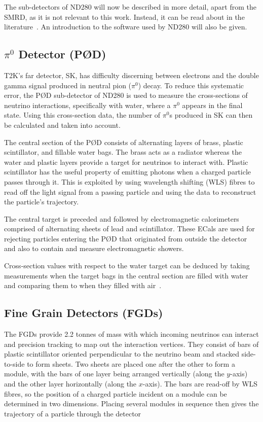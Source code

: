 \documentclass[aps,pra,12pt,notitlepage,tightenlines]{revtex4-1}
\begin{document}
The sub-detectors of ND280 will now be described in more detail, apart from the SMRD, as it is not relevant to this work. Instead, it can be read about in the literature~\cite{Aoki2013}. An introduction to the software used by ND280 will also be given.

\subsection{$\pi^0$ Detector (P\O D)}
T2K's far detector, SK, has difficulty discerning between electrons and the double gamma signal produced in neutral pion ($\pi^0$) decay. To reduce this systematic error, the P\O D sub-detector of ND280 is used to measure the cross-sections of neutrino interactions, specifically with water, where a $\pi^0$ appears in the final state. Using this cross-section data, the number of $\pi^0$s produced in SK can then be calculated and taken into account.

The central section of the P\O D consists of alternating layers of brass, plastic scintillator, and fillable water bags. The brass acts as a radiator whereas the water and plastic layers provide a target for neutrinos to interact with. Plastic scintillator has the useful property of emitting photons when a charged particle passes through it. This is exploited by using wavelength shifting (WLS) fibres to read off the light signal from a passing particle and using the data to reconstruct the particle's trajectory. 

The central target is preceded and followed by electromagnetic calorimeters comprised of alternating sheets of lead and scintillator. These ECals are used for rejecting particles entering the P\O D that originated from outside the detector and also to contain and measure electromagnetic showers. 

Cross-section values with respect to the water target can be deduced by taking measurements when the target bags in the central section are filled with water and comparing them to when they filled with air~\cite{ABE2011106, Assylbekov:2011sh}.

\subsection{Fine Grain Detectors (FGDs)}
The FGDs provide 2.2 tonnes of mass with which incoming neutrinos can interact and precision tracking to map out the interaction vertices. They consist of bars of plastic scintillator oriented perpendicular to the neutrino beam and stacked side-to-side to form sheets. Two sheets are placed one after the other to form a module, with the bars of one layer being arranged vertically (along the $y$-axis) and the other layer horizontally (along the $x$-axis). The bars are read-off by WLS fibres, so the position of a charged particle incident on a module can be determined in two dimensions. Placing several modules in sequence then gives the trajectory of a particle through the detector
\end{document}
